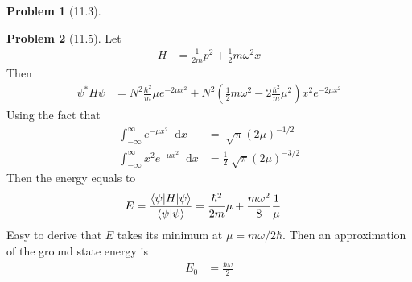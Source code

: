 \documentclass[twoside,11pt]{article}
\renewcommand*\d{\mathop{}\!\mathrm{d}}
\theoremstyle{definition}
\newtheorem{problem}{Problem}
\theoremstyle{remark}
\begin{document}
\begin{problem}[11.3]
\end{problem}


\begin{problem}[11.5]
Let
\begin{align*}
    H &= \frac{1}{2m}p^2 + \frac{1}{2}m\omega^2 x
\end{align*}
Then
\begin{align*}
    \psi^* H\psi &= N^2\frac{\hbar^2}{m}\mu e^{-2\mu x^2} + 
    N^2\left(\frac{1}{2}m\omega^2 - 2\frac{\hbar^2}{m}\mu^2\right)
    x^2e^{-2\mu x^2}
\end{align*}
Using the fact that
\begin{align*}
    \int_{-\infty}^{\infty} e^{-\mu x^2}\d x &= \sqrt[]{\pi}(2\mu)^{-1/2}\\
    \int_{-\infty}^{\infty} x^2e^{-\mu x^2}\d x &= \frac{1}{2}\sqrt[]{\pi}(2\mu)^{-3/2}
\end{align*}
Then the energy equals to
\begin{align*}
    E &= \frac{\braket{\psi|H|\psi}}{\braket{\psi|\psi}} = 
    \frac{\hbar^2}{2m}\mu + \frac{m\omega^2}{8}\frac{1}{\mu}
\end{align*}
Easy to derive that $E$ takes its minimum at $\mu=m\omega/2\hbar$.
Then an approximation of the ground state energy is
\begin{align*}
    E_0 &= \frac{\hbar\omega}{2}
\end{align*}


\end{problem}
\end{document}

